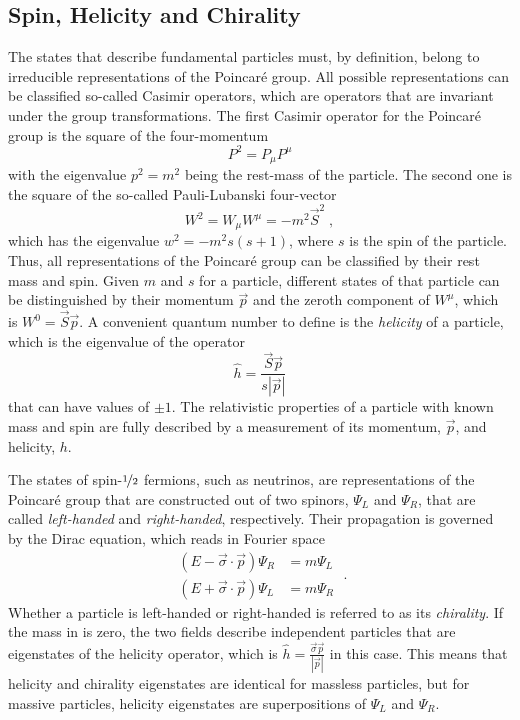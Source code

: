 \subsection{Spin, Helicity and Chirality}
The states that describe fundamental particles must, by definition, belong to irreducible representations of the Poincar\'{e} group. All possible representations can be classified so-called Casimir operators, which are operators that are invariant under the group transformations. The first Casimir operator for the Poincar\'{e} group is the square of the four-momentum
\begin{equation}
    P^2 = P_\mu P^\mu
\end{equation}
with the eigenvalue $p^2 = m^2$ being the rest-mass of the particle. The second one is the square of the so-called Pauli-Lubanski four-vector
\begin{equation}
    W^2 = W_\mu W^\mu = -m^2 \vec{S}^2\;,
\end{equation}
which has the eigenvalue $w^2 = -m^2 s(s+1)$, where $s$ is the spin of the particle. Thus, all representations of the Poincar\'{e} group can be classified by their rest mass and spin. Given $m$ and $s$ for a particle, different states of that particle can be distinguished by their momentum $\vec{p}$ and the zeroth component of $W^\mu$, which is $W^0 = \vec{S}\vec{p}$. A convenient quantum number to define is the \emph{helicity} of a particle, which is the eigenvalue of the operator
\begin{equation}
    \hat{h} = \frac{\vec{S}\vec{p}}{s |\vec{p}|}
\end{equation}
that can have values of $\pm1$. The relativistic properties of a particle with known mass and spin are fully described by a measurement of its momentum, $\vec{p}$, and helicity, $h$.

The states of spin-$\nicefrac{1}{2}$ fermions, such as neutrinos, are representations of the Poincar\'{e} group that are constructed out of two spinors, $\Psi_L$ and $\Psi_R$, that are called \emph{left-handed} and \emph{right-handed}, respectively. Their propagation is governed by the Dirac equation, which reads in Fourier space
\begin{equation}
\begin{aligned}
    (E - \vec{\sigma}\cdot \vec{p})\Psi_R &= m \Psi_L \\
    (E + \vec{\sigma}\cdot \vec{p})\Psi_L &= m \Psi_R
\end{aligned}\;.\label{eq:dirac-chirality}
\end{equation}
Whether a particle is left-handed or right-handed is referred to as its \emph{chirality}. If the mass in  is zero, the two fields describe independent particles that are eigenstates of the helicity operator, which is $\hat{h}=\frac{\vec{\sigma}\vec{p}}{|\vec{p}|}$ in this case. This means that helicity and chirality eigenstates are identical for massless particles, but for massive particles, helicity eigenstates are superpositions of $\Psi_L$ and $\Psi_R$.

